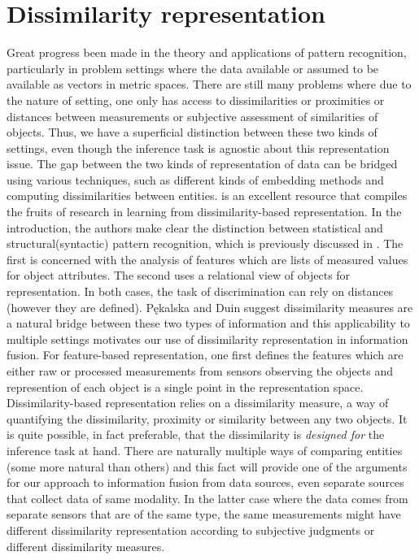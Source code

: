 \documentclass[12pt,oneside,final]{thesis}
\begin{document}
\section{Dissimilarity representation\label{sec:dissim_repr}}
 Great progress been made in the theory and applications of pattern recognition, particularly in problem settings where the data available or assumed to be available as vectors in metric spaces. There are still many problems where due to the nature of setting, one only has access to dissimilarities or  proximities or distances between measurements or subjective assessment  of similarities of objects. Thus, we have a superficial distinction between these two kinds of settings, even though the inference task is agnostic about this representation issue. The gap between the two kinds of representation of data can be bridged using various  techniques, such as different kinds of embedding methods and computing dissimilarities between entities.
 \cite{duin2005dissimilarity} is an excellent resource that compiles the fruits of research in learning from  dissimilarity-based representation. In the introduction, the authors make clear the distinction between statistical and structural(syntactic) pattern recognition, which is previously discussed in \cite{NadlerSmith1993}. The first is concerned with the analysis of features which are lists of measured values for object attributes. The second uses a relational view of objects for representation. In both cases,  the task of discrimination  can rely on distances (however they are defined). P\k{e}kalska and Duin  suggest dissimilarity measures  are a natural bridge between these two types of information and this applicability to  multiple settings motivates our use of dissimilarity representation in information fusion. 
For feature-based representation, one first defines the features which are either raw or processed measurements from sensors observing the objects and  represention of each object is a single point in the representation space. Dissimilarity-based representation relies on a dissimilarity measure, a way of quantifying the dissimilarity, proximity or similarity between any two objects. It is quite possible, in fact preferable, that the dissimilarity is \emph{designed for} the inference task at hand. 
There are naturally multiple ways of comparing entities  (some more natural than others) and this fact will provide one of the arguments for our approach to information fusion from  data sources, even separate sources that collect  data of same modality. In  the latter case where the data comes from separate sensors that are of the same type, the same measurements might have different dissimilarity representation according to subjective judgments or different dissimilarity  measures. 
\end{document}
